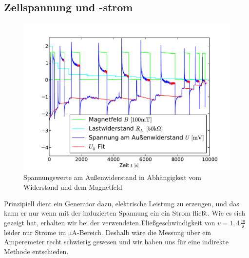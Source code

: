 \documentclass[11pt]{scrartcl}
\newcommand{\unit}[1]{\ensuremath{\,\mathrm{#1}}} %
\begin{document}
\subsection{Zellspannung und -strom}		%
\begin{figure}[ht]
\begin{center}
\includegraphics[width=1.0\textwidth]{images/rohdaten_strom.pdf}
\end{center}
\vspace{-1.5\baselineskip}
\caption{Spannungswerte am Außenwiderstand in Abhängigkeit vom Widerstand und dem Magnetfeld}
\label{rohdatenstrom}
\end{figure}
Prinzipiell dient ein Generator dazu, elektrische Leistung zu erzeugen, und das kann er nur wenn mit der induzierten Spannung ein ein Strom fließt.
Wie es sich gezeigt hat, erhalten wir bei der verwendeten Fließgeschwindigkeit von $v=1,4\unit{\frac{m}{s}}$ leider nur Ströme im $\mathrm{\mu A}$-Bereich.
Deshalb wäre die Messung über ein Amperemeter recht schwierig gewesen und wir haben uns für eine indirekte Methode entschieden.
\end{document}
